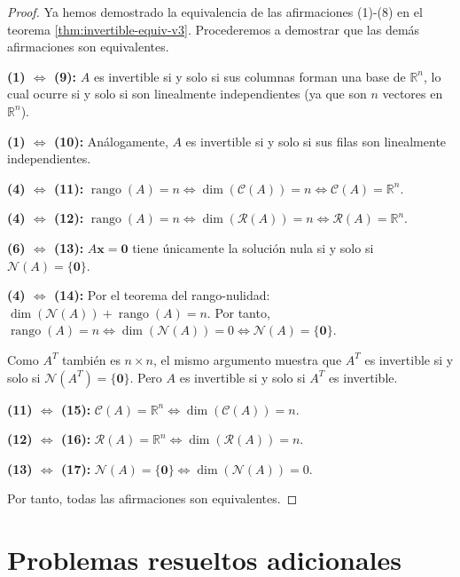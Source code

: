 \begin{proof}
Ya hemos demostrado la equivalencia de las afirmaciones (1)-(8) en el teorema \ref{thm:invertible-equiv-v3}. Procederemos a demostrar que las demás afirmaciones son equivalentes.

\textbf{(1) $\Leftrightarrow$ (9):} $A$ es invertible si y solo si sus columnas forman una base de $\mathbb{R}^n$, lo cual ocurre si y solo si son linealmente independientes (ya que son $n$ vectores en $\mathbb{R}^n$).

\textbf{(1) $\Leftrightarrow$ (10):} Análogamente, $A$ es invertible si y solo si sus filas son linealmente independientes.

\textbf{(4) $\Leftrightarrow$ (11):} $\operatorname{rango}(A) = n \Leftrightarrow \dim(\mathcal{C}(A)) = n \Leftrightarrow \mathcal{C}(A) = \mathbb{R}^n$.

\textbf{(4) $\Leftrightarrow$ (12):} $\operatorname{rango}(A) = n \Leftrightarrow \dim(\mathcal{R}(A)) = n \Leftrightarrow \mathcal{R}(A) = \mathbb{R}^n$.

\textbf{(6) $\Leftrightarrow$ (13):} $A\mathbf{x} = \mathbf{0}$ tiene únicamente la solución nula si y solo si $\mathcal{N}(A) = \{\mathbf{0}\}$.

\textbf{(4) $\Leftrightarrow$ (14):} Por el teorema del rango-nulidad: $\dim(\mathcal{N}(A)) + \operatorname{rango}(A) = n$. Por tanto, $\operatorname{rango}(A) = n \Leftrightarrow \dim(\mathcal{N}(A)) = 0 \Leftrightarrow \mathcal{N}(A) = \{\mathbf{0}\}$. 

Como $A^T$ también es $n \times n$, el mismo argumento muestra que $A^T$ es invertible si y solo si $\mathcal{N}(A^T) = \{\mathbf{0}\}$. Pero $A$ es invertible si y solo si $A^T$ es invertible.

\textbf{(11) $\Leftrightarrow$ (15):} $\mathcal{C}(A) = \mathbb{R}^n \Leftrightarrow \dim(\mathcal{C}(A)) = n$.

\textbf{(12) $\Leftrightarrow$ (16):} $\mathcal{R}(A) = \mathbb{R}^n \Leftrightarrow \dim(\mathcal{R}(A)) = n$.

\textbf{(13) $\Leftrightarrow$ (17):} $\mathcal{N}(A) = \{\mathbf{0}\} \Leftrightarrow \dim(\mathcal{N}(A)) = 0$.

Por tanto, todas las afirmaciones son equivalentes.
\end{proof}


\section{Problemas resueltos adicionales}

